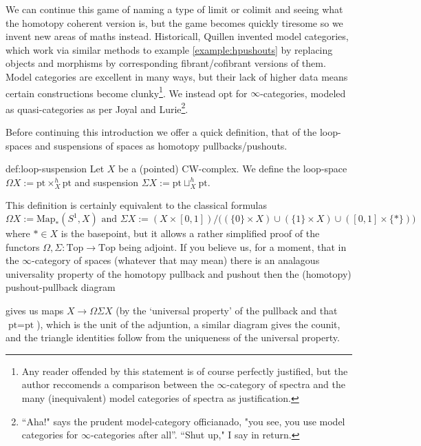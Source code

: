 We can continue this game of naming a type of limit or colimit and seeing what the homotopy coherent version is, but the game becomes quickly tiresome so we invent new areas of maths instead. Historicall, Quillen invented model categories, which work via similar methods to example \ref{example:hpushouts} by replacing objects and morphisms by corresponding fibrant/cofibrant versions of them. Model categories are excellent in many ways, but their lack of higher data means certain constructions become clunky\footnote{Any reader offended by this statement is of course perfectly justified, but the author reccomends a comparison between the $\infty$-category of spectra and the many (inequivalent) model categories of spectra as justification.}. We instead opt for $\infty$-categories, modeled as quasi-categories as per Joyal and Lurie\footnote{``Aha!" says the prudent model-category officianado, "you see, you use model categories for $\infty$-categories after all''. ``Shut up," I say in return.}.

Before continuing this introduction we offer a quick definition, that of the loop-spaces and suspensions of spaces as homotopy pullbacks/pushouts.

\begin{definition}{def:loop-suspension}
Let $X$ be a (pointed) CW-complex. We define the loop-space $\Omega X := \text{pt} \times_X^h \text{pt}$ and suspension $\Sigma X := \text{pt} \sqcup_X^h \text{pt}$. 
\end{definition}

This definition is certainly equivalent to the classical formulas
	\[
	\Omega X := \text{Map}_\ast(S^1,X)
	\text{ and }
	\Sigma X := (X \times [0,1]) / \big( (\{0\}\times X) \cup (\{1\}\times X) \cup ([0,1]\times\{\ast\}) \big)
	\]
where $\ast\in X$ is the basepoint, but it allows a rather simplified proof of the functors $\Omega, \Sigma : \text{Top} \to \text{Top}$ being adjoint. If you believe us, for a moment, that in the $\infty$-category of spaces (whatever that may mean) there is an analagous universality property of the homotopy pullback and pushout then the (homotopy) pushout-pullback diagram 
	\begin{center}
	\end{center}
gives us maps $X \to \Omega\Sigma X$ (by the `universal property' of the pullback and that $\text{pt} = \text{pt}$), which is the unit of the adjuntion, a similar diagram gives the counit, and the triangle identities follow from the uniqueness of the universal property. 



